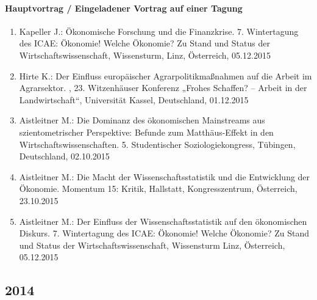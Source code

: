 \paragraph{Hauptvortrag / Eingeladener Vortrag auf einer Tagung}
\begin{enumerate}
	\item Kapeller J.: Ökonomische Forschung und die Finanzkrise. 7. Wintertagung des ICAE: Ökonomie! Welche Ökonomie? Zu Stand und Status der Wirtschaftswissenschaft, Wissensturm, Linz, Österreich, 05.12.2015
	\item Hirte K.: Der Einfluss europäischer Agrarpolitikmaßnahmen auf die Arbeit im Agrarsektor. , 23. Witzenhäuser Konferenz „Frohes Schaffen? – Arbeit in der Landwirtschaft“, Universität Kassel, Deutschland, 01.12.2015
	\item Aistleitner M.: Die Dominanz des ökonomischen Mainstreams aus szientometrischer Perspektive: Befunde zum \glqq Matthäus-Effekt\grqq{} in den Wirtschaftswissenschaften. 5. Studentischer Soziologiekongress, Tübingen, Deutschland, 02.10.2015
	\item Aistleitner M.: Die Macht der Wissenschaftsstatistik und die Entwicklung der Ökonomie. Momentum 15: Kritik, Hallstatt, Kongresszentrum, Österreich, 23.10.2015
	\item Aistleitner M.: Der Einfluss der Wissenschaftsstatistik auf den ökonomischen Diskurs. 7. Wintertagung des ICAE: Ökonomie! Welche Ökonomie? Zu Stand und Status der Wirtschaftswissenschaft, Wissensturm Linz, Österreich, 05.12.2015
\end{enumerate}
\subsection*{2014}
